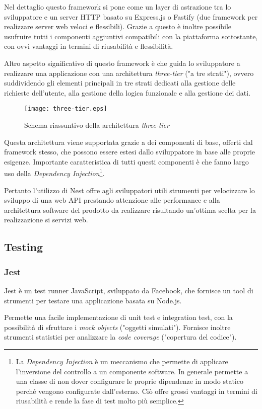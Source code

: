 Nel dettaglio questo framework si pone come un layer di astrazione tra lo sviluppatore e un server HTTP basato su Express.js o Fastify (due framework per realizzare
server web veloci e flessibili). Grazie a questo è inoltre possibile usufruire tutti i componenti aggiuntivi compatibili con la piattaforma sottostante, con ovvi
vantaggi in termini di riusabilità e flessibilità.

Altro aspetto significativo di questo framework è che guida lo sviluppatore a realizzare una applicazione con una architettura \textit{three-tier} ("a tre strati"),
ovvero suddividendo gli elementi principali in tre strati dedicati alla gestione delle richieste dell'utente, alla gestione della logica funzionale e alla gestione dei dati.
\begin{figure}[h]
    \centering
    \texttt{[image: three-tier.eps]}
    \caption{Schema riassuntivo della architettura \textit{three-tier}}
    \label{fig:three-tier}
\end{figure}
\newpage

Questa architettura viene supportata grazie a dei componenti di base, offerti dal framework stesso, che possono
essere estesi dallo sviluppatore in base alle proprie esigenze.
Importante caratteristica di tutti questi componenti è che fanno largo uso della
\textit{Dependency Injection}\footnote{
    La \textit{Dependency Injection} è un meccanismo che permette di applicare
    l'inversione del controllo a un componente software. In generale permette a una classe di non dover configurare
    le proprie dipendenze in modo statico perché vengono configurate dall'esterno. Ciò offre grossi vantaggi in termini di riusabilità e rende la fase di test molto più semplice.}.

Pertanto l'utilizzo di Nest offre agli sviluppatori utili strumenti per velocizzare lo sviluppo di una web API prestando attenzione
alle performance e alla architettura software del prodotto da realizzare risultando un'ottima scelta per la realizzazione si servizi web.

\subsection{Testing}
\subsubsection{Jest}
Jest\cite{Jest} è un test runner JavaScript, sviluppato da Facebook, che fornisce un tool di strumenti per testare una applicazione basata su Node.js.

Permette una facile implementazione di unit test e integration test, con la possibilità di
sfruttare i \textit{mock objects} ("oggetti simulati"). Fornisce inoltre strumenti statistici per analizzare
la \textit{code coverage} ("copertura del codice").


